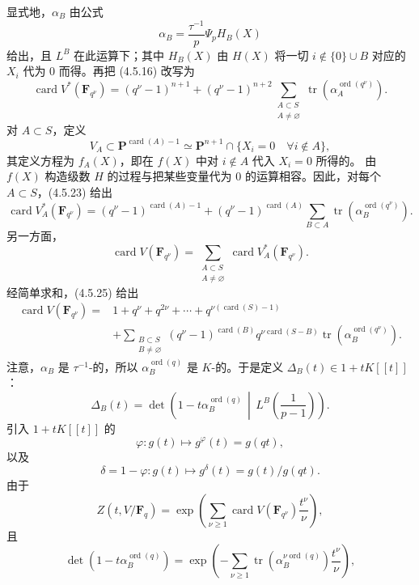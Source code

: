 显式地，$\alpha_B$ 由公式
\[
\alpha_B=\frac{\tau^{-1}}p\Psi_pH_B(X)\tag{4.5.22}
\]
给出，且 $L^B$ 在此运算下；其中 $H_B(X)$ 由 $H(X)$ 将一切 $i\notin\{0\}\cup B$ 对应的 $X_i$ 代为 $0$ 而得。再把 (4.5.16) 改写为
\[
\operatorname{card}V^*(\mathbf F_{q^\nu})=(q^\nu-1)^{n+1}
+(q^\nu-1)^{n+2}\sum_{\substack{A\subset S\\A\ne\varnothing}}
\operatorname{tr}(\alpha_A^{\operatorname{ord}(q^\nu)}).\tag{4.5.2.3}
\]
对 $A\subset S$，定义
\[
V_A\subset\mathbf P^{\operatorname{card}(A)-1}
\simeq\mathbf P^{n+1}\cap\{X_i=0\quad\forall i\notin A\},\tag{4.5.24}
\]
其定义方程为 $f_A(X)$，即在 $f(X)$ 中对 $i\notin A$ 代入 $X_i=0$ 所得的。
由 $f(X)$ 构造级数 $H$ 的过程与把某些变量代为 $0$ 的运算相容。因此，对每个 $A\subset S$，(4.5.23) 给出
\[
\operatorname{card}V_A^*(\mathbf F_{q^\nu})
=(q^\nu-1)^{\operatorname{card}(A)-1}
+(q^\nu-1)^{\operatorname{card}(A)}\sum_{B\subset A}\operatorname{tr}(\alpha_B^{\operatorname{ord}(q^\nu)}).\tag{4.5.25}
\]
另一方面，
\[
\operatorname{card}V(\mathbf F_{q^\nu})
=\sum_{\substack{A\subset S\\A\ne\varnothing}}\operatorname{card}V_A^*(\mathbf F_{q^\nu}).\tag{4.5.26}
\]
经简单求和，(4.5.25) 给出
\[
\begin{aligned}
\operatorname{card}V(\mathbf F_{q^\nu})
={}&1+q^\nu+q^{2\nu}+\cdots+q^{\nu(\operatorname{card}(S)-1)}\\
&+\sum_{\substack{B\subset S\\B\ne\varnothing}}
(q^\nu-1)^{\operatorname{card}(B)}q^{\nu\operatorname{card}(S-B)}
\operatorname{tr}(\alpha_B^{\operatorname{ord}(q^\nu)}).
\end{aligned}\tag{4.5.27}
\]
注意，$\alpha_B$ 是 $\tau^{-1}$-的，所以 $\alpha_B^{\operatorname{ord}(q)}$ 是 $K$-的。于是定义 $\Delta_B(t)\in1+tK[[t]]$：
\[
\Delta_B(t)=\det\left(1-t\alpha_B^{\operatorname{ord}(q)}\,\middle|\,
L^B\left(\frac1{p-1}\right)\right).\tag{4.5.28}
\]
引入 $1+tK[[t]]$ 的
\[
\varphi:g(t)\longmapsto g^\varphi(t)=g(qt),\tag{4.5.29}
\]
以及
\[
\delta=1-\varphi:g(t)\longmapsto g^\delta(t)=g(t)/g(qt).\tag{4.5.30}
\]
由于
\[
Z(t,V/\mathbf F_q)=\exp\left(\sum_{\nu\ge1}\operatorname{card}V(\mathbf F_{q^\nu})\frac{t^\nu}{\nu}\right),\tag{4.5.31}
\]
且
\[
\det(1-t\alpha_B^{\operatorname{ord}(q)})
=\exp\left(-\sum_{\nu\ge1}\operatorname{tr}(\alpha_B^{\nu\operatorname{ord}(q)})\frac{t^\nu}{\nu}\right),\tag{4.5.32}
\]
